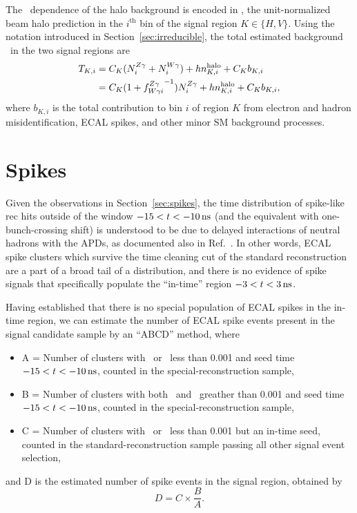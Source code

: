 The \ETg\ dependence of the halo background is encoded in \nhalo[,i], the unit-normalized beam halo prediction in the $i^\mathrm{th}$ bin of the signal region $K \in \{H,V\}$.
Using the notation introduced in Section~\ref{sec:irreducible}, the total estimated background \TK\ in the two signal regions are
\begin{equation}
\begin{aligned}
  \TK[,i] & = C_{K} (\NZg[i] + \NWg[i]) + h \nhalo[,i] + C_{K} b_{K,i} \\
          & = C_{K} (1 + {\fZW[i]}^{-1}) \NZg[i] + h \nhalo[,i] + C_{K} b_{K,i},
\end{aligned}
\end{equation}
where $b_{K,i}$ is the total contribution to bin $i$ of region $K$ from electron and hadron misidentification, ECAL spikes, and other minor SM background processes.

\section{Spikes}
\label{sec:spike_estimate}

Given the observations in Section~\ref{sec:spikes}, the time distribution of spike-like rec hits outside of the window $-15 < t < -10\ns$ (and the equivalent with one-bunch-crossing shift) is understood to be due to delayed interactions of neutral hadrons with the APDs, as documented also in Ref.~\cite{CMS_AN_2010-357}. 
In other words, ECAL spike clusters which survive the time cleaning cut of the standard reconstruction are a part of a broad tail of a distribution, and there is no evidence of spike signals that specifically populate the ``in-time'' region $-3 < t < 3\ns$.

Having established that there is no special population of ECAL spikes in the in-time region, we can estimate the number of ECAL spike events present in the signal candidate sample by an ``ABCD'' method, where
\begin{itemize}
  \item A = Number of clusters with \sieie\ or \sipip\ less than 0.001 and seed time $-15 < t < -10\ns$, counted in the special-reconstruction sample,
  \item B = Number of clusters with both \sieie\ and \sipip\ greather than 0.001 and seed time $-15 < t < -10\ns$, counted in the special-reconstruction sample, 
  \item C = Number of clusters with \sieie\ or \sipip\ less than 0.001 but an in-time seed, counted in the standard-reconstruction sample passing all other signal event selection, 
\end{itemize}
and D is the estimated number of spike events in the signal region, obtained by
\begin{equation}
  D = C \times \frac{B}{A}.
\end{equation}

